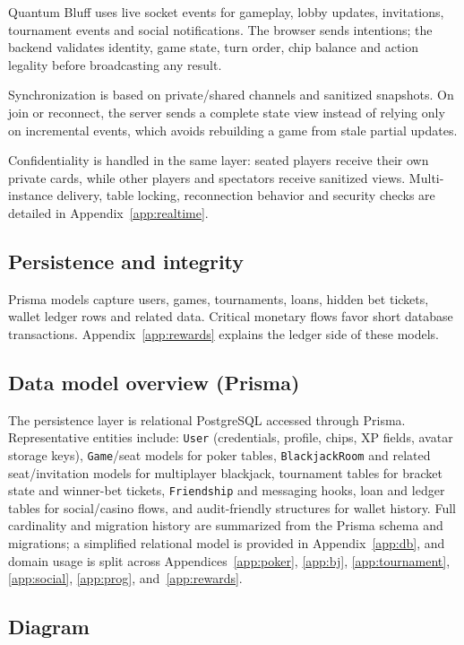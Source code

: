 \documentclass[11pt,a4paper]{article}
\begin{document}
Quantum Bluff uses live socket events for gameplay, lobby updates, invitations, tournament events and social notifications. The browser sends intentions; the backend validates identity, game state, turn order, chip balance and action legality before broadcasting any result.

Synchronization is based on private/shared channels and sanitized snapshots. On join or reconnect, the server sends a complete state view instead of relying only on incremental events, which avoids rebuilding a game from stale partial updates.

Confidentiality is handled in the same layer: seated players receive their own private cards, while other players and spectators receive sanitized views. Multi-instance delivery, table locking, reconnection behavior and security checks are detailed in Appendix~\ref{app:realtime}.

\subsection{Persistence and integrity}

Prisma models capture users, games, tournaments, loans, hidden bet tickets, wallet ledger rows and related data. Critical monetary flows favor short database transactions. Appendix~\ref{app:rewards} explains the ledger side of these models.

\subsection{Data model overview (Prisma)}

The persistence layer is relational PostgreSQL accessed through Prisma. Representative entities include: \texttt{User} (credentials, profile, chips, XP fields, avatar storage keys), \texttt{Game}/seat models for poker tables, \texttt{BlackjackRoom} and related seat/invitation models for multiplayer blackjack, tournament tables for bracket state and winner-bet tickets, \texttt{Friendship} and messaging hooks, loan and ledger tables for social/casino flows, and audit-friendly structures for wallet history. Full cardinality and migration history are summarized from the Prisma schema and migrations; a simplified relational model is provided in Appendix~\ref{app:db}, and domain usage is split across Appendices~\ref{app:poker}, \ref{app:bj}, \ref{app:tournament}, \ref{app:social}, \ref{app:prog}, and~\ref{app:rewards}.

\subsection{Diagram}
\end{document}
